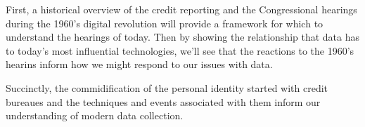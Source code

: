 First, a historical overview of the credit reporting and the Congressional
hearings during the 1960's digital revolution will provide a framework for
which to understand the hearings of today. Then by showing the relationship
that data has to today's most influential technologies, we'll see that the
reactions to the 1960's hearins inform how we might respond to our issues with
data.

Succinctly, the commidification of the personal identity started with credit
bureaues and the techniques and events associated with them inform our
understanding of modern data collection.








